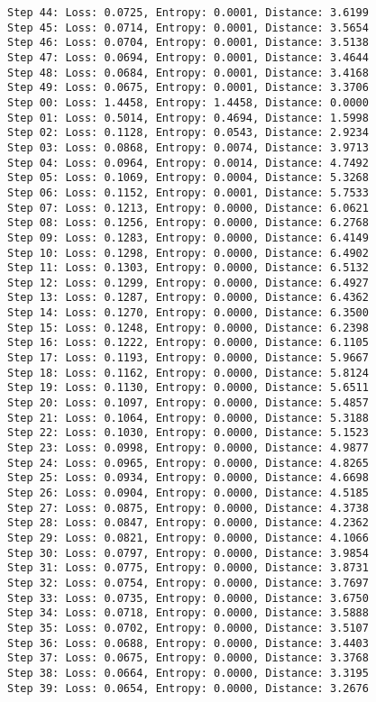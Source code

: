 \documentclass[11pt]{article}
\begin{document}
\begin{Verbatim}[commandchars=\\\{\}]
Step 44: Loss: 0.0725, Entropy: 0.0001, Distance: 3.6199
Step 45: Loss: 0.0714, Entropy: 0.0001, Distance: 3.5654
Step 46: Loss: 0.0704, Entropy: 0.0001, Distance: 3.5138
Step 47: Loss: 0.0694, Entropy: 0.0001, Distance: 3.4644
Step 48: Loss: 0.0684, Entropy: 0.0001, Distance: 3.4168
Step 49: Loss: 0.0675, Entropy: 0.0001, Distance: 3.3706
Step 00: Loss: 1.4458, Entropy: 1.4458, Distance: 0.0000
Step 01: Loss: 0.5014, Entropy: 0.4694, Distance: 1.5998
Step 02: Loss: 0.1128, Entropy: 0.0543, Distance: 2.9234
Step 03: Loss: 0.0868, Entropy: 0.0074, Distance: 3.9713
Step 04: Loss: 0.0964, Entropy: 0.0014, Distance: 4.7492
Step 05: Loss: 0.1069, Entropy: 0.0004, Distance: 5.3268
Step 06: Loss: 0.1152, Entropy: 0.0001, Distance: 5.7533
Step 07: Loss: 0.1213, Entropy: 0.0000, Distance: 6.0621
Step 08: Loss: 0.1256, Entropy: 0.0000, Distance: 6.2768
Step 09: Loss: 0.1283, Entropy: 0.0000, Distance: 6.4149
Step 10: Loss: 0.1298, Entropy: 0.0000, Distance: 6.4902
Step 11: Loss: 0.1303, Entropy: 0.0000, Distance: 6.5132
Step 12: Loss: 0.1299, Entropy: 0.0000, Distance: 6.4927
Step 13: Loss: 0.1287, Entropy: 0.0000, Distance: 6.4362
Step 14: Loss: 0.1270, Entropy: 0.0000, Distance: 6.3500
Step 15: Loss: 0.1248, Entropy: 0.0000, Distance: 6.2398
Step 16: Loss: 0.1222, Entropy: 0.0000, Distance: 6.1105
Step 17: Loss: 0.1193, Entropy: 0.0000, Distance: 5.9667
Step 18: Loss: 0.1162, Entropy: 0.0000, Distance: 5.8124
Step 19: Loss: 0.1130, Entropy: 0.0000, Distance: 5.6511
Step 20: Loss: 0.1097, Entropy: 0.0000, Distance: 5.4857
Step 21: Loss: 0.1064, Entropy: 0.0000, Distance: 5.3188
Step 22: Loss: 0.1030, Entropy: 0.0000, Distance: 5.1523
Step 23: Loss: 0.0998, Entropy: 0.0000, Distance: 4.9877
Step 24: Loss: 0.0965, Entropy: 0.0000, Distance: 4.8265
Step 25: Loss: 0.0934, Entropy: 0.0000, Distance: 4.6698
Step 26: Loss: 0.0904, Entropy: 0.0000, Distance: 4.5185
Step 27: Loss: 0.0875, Entropy: 0.0000, Distance: 4.3738
Step 28: Loss: 0.0847, Entropy: 0.0000, Distance: 4.2362
Step 29: Loss: 0.0821, Entropy: 0.0000, Distance: 4.1066
Step 30: Loss: 0.0797, Entropy: 0.0000, Distance: 3.9854
Step 31: Loss: 0.0775, Entropy: 0.0000, Distance: 3.8731
Step 32: Loss: 0.0754, Entropy: 0.0000, Distance: 3.7697
Step 33: Loss: 0.0735, Entropy: 0.0000, Distance: 3.6750
Step 34: Loss: 0.0718, Entropy: 0.0000, Distance: 3.5888
Step 35: Loss: 0.0702, Entropy: 0.0000, Distance: 3.5107
Step 36: Loss: 0.0688, Entropy: 0.0000, Distance: 3.4403
Step 37: Loss: 0.0675, Entropy: 0.0000, Distance: 3.3768
Step 38: Loss: 0.0664, Entropy: 0.0000, Distance: 3.3195
Step 39: Loss: 0.0654, Entropy: 0.0000, Distance: 3.2676

\end{Verbatim}
\end{document}
